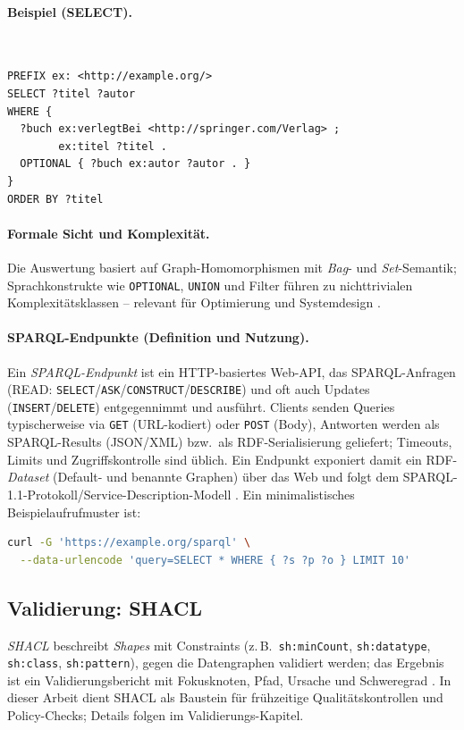 \paragraph{Beispiel (SELECT).}\mbox{}\\[-1.5ex]
\begin{lstlisting}
PREFIX ex: <http://example.org/>
SELECT ?titel ?autor
WHERE {
  ?buch ex:verlegtBei <http://springer.com/Verlag> ;
        ex:titel ?titel .
  OPTIONAL { ?buch ex:autor ?autor . }
}
ORDER BY ?titel
\end{lstlisting}

\paragraph{Formale Sicht und Komplexität.}
Die Auswertung basiert auf Graph-Homomorphismen mit \emph{Bag}- und \emph{Set}-Semantik; Sprachkonstrukte wie \texttt{OPTIONAL}, \texttt{UNION} und Filter führen zu nichttrivialen Komplexitätsklassen -- relevant für Optimierung und Systemdesign \cite{perezGutierrezSparql}.

\paragraph{SPARQL-Endpunkte (Definition und Nutzung).}
Ein \emph{SPARQL-Endpunkt} ist ein HTTP-basiertes Web-API, das SPARQL-Anfragen (READ: \texttt{SELECT}/\texttt{ASK}/\texttt{CONSTRUCT}/\texttt{DESCRIBE}) und oft auch Updates (\texttt{INSERT}/\texttt{DELETE}) entgegennimmt und ausführt. Clients senden Queries typischerweise via \texttt{GET} (URL-kodiert) oder \texttt{POST} (Body), Antworten werden als SPARQL-Results (JSON/XML) bzw.\ als RDF-Serialisierung geliefert; Timeouts, Limits und Zugriffskontrolle sind üblich. Ein Endpunkt exponiert damit ein RDF-\emph{Dataset} (Default- und benannte Graphen) über das Web und folgt dem SPARQL-1.1-Protokoll/Service-Description-Modell \cite{SPARQL11Overview}. Ein minimalistisches Beispielaufrufmuster ist:
\begin{lstlisting}[language=bash]
curl -G 'https://example.org/sparql' \
  --data-urlencode 'query=SELECT * WHERE { ?s ?p ?o } LIMIT 10'
\end{lstlisting}

\subsection{Validierung: SHACL}

\emph{SHACL} beschreibt \emph{Shapes} mit Constraints (z.\,B.\ \texttt{sh:minCount}, \texttt{sh:datatype}, \texttt{sh:class}, \texttt{sh:pattern}), gegen die Datengraphen validiert werden; das Ergebnis ist ein Validierungsbericht mit Fokusknoten, Pfad, Ursache und Schweregrad \cite{SHACL12}. In dieser Arbeit dient SHACL als Baustein für frühzeitige Qualitätskontrollen und Policy-Checks; Details folgen im Validierungs-Kapitel.


